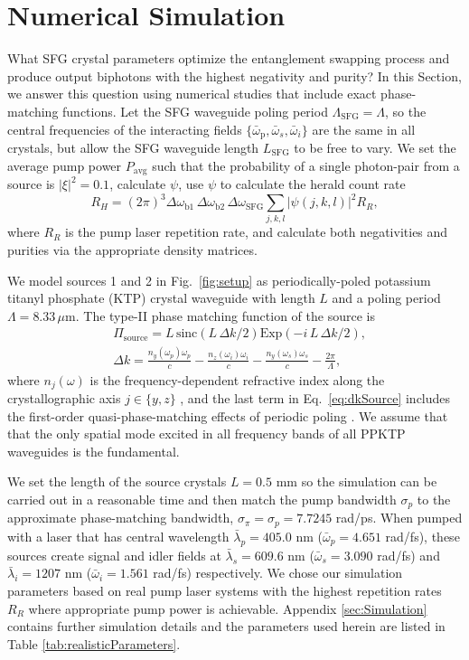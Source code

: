 \documentclass[twocolumn,amssymb, nobibnotes, showpacs, aps, pra,10pt]{revtex4-1}
\newcommand*{\ws}{\omega_{s}}
\newcommand*{\wpbar}{\bar{\omega}_{\text{p}}}
\newcommand*{\wbone}{\omega_{\textrm{b}1}}
\newcommand*{\wbtwo}{\omega_{\textrm{b}2}}
\newcommand*{\wsfg}{\omega_\textrm{SFG}}
\begin{document}
\section{Numerical Simulation} \label{sec:simulation}
What SFG crystal parameters optimize the entanglement swapping process and produce output biphotons with the highest negativity and purity? In this Section, we answer this question using numerical studies that include exact phase-matching functions. Let the SFG waveguide poling period $\Lambda_{\text{SFG}} = \Lambda$, so the central frequencies of the interacting fields $\{\wpbar, \bar{\omega}_s, \bar{\omega}_i \}$ are the same in all crystals, but allow the SFG waveguide length $L_{\text{SFG}}$ to be free to vary. We set the average pump power $P_{\text{avg}}$ such that the probability of a single photon-pair from a source is $|\xi|^2 = 0.1$, calculate $\psi$, use $\psi$ to calculate the herald count rate
\begin{equation}
R_H  = (2 \pi)^3 \Delta \wbone \, \Delta \wbtwo \, \Delta \wsfg   \sum_{j,k,l} |\psi(j,k,l)|^2 R_R,
\end{equation}
where $R_R$ is the pump laser repetition rate, and calculate both negativities and purities via the appropriate density matrices.

We model sources 1 and 2 in Fig.\ \ref{fig:setup} as periodically-poled potassium titanyl phosphate (KTP) crystal waveguide with length $L$ and a poling period $\Lambda=8.33\, \mu$m. The type-II phase matching function of the source is
\begin{align}
&\Pi_{\text{source}} =  L\, \text{sinc} \left(L \,\Delta k/2 \right) \text{Exp}\left( - i \, L \,\Delta k/2 \right), \label{eq:PMexact} \\
&\Delta k =   \frac{n_y (\omega_p) \omega_p}{c} - \frac{n_z (\omega_i) \omega_i}{c} - \frac{n_y (\ws) \ws}{c} - \frac{2 \pi}{\Lambda}, \label{eq:dkSource}
\end{align}
where $n_j (\omega)$ is the frequency-dependent refractive index along the crystallographic axis $j \in \{y, z\}$ \cite{Kato2002}, and the last term in Eq.\ \eqref{eq:dkSource} includes the first-order quasi-phase-matching effects of periodic poling \cite{Fejer1992}. We assume that that the only spatial mode excited in all frequency bands of all PPKTP waveguides is the fundamental. 

We set the length of the source crystals $L=0.5$ mm so the simulation can be carried out in a reasonable time and then match the pump bandwidth $\sigma_p$ to the approximate phase-matching bandwidth, $\sigma_\pi = \sigma_p =7.7245$ rad/ps. When pumped with a laser that has central wavelength $\bar{\lambda}_p=405.0$ nm ($\bar{\omega}_p = 4.651$ rad/fs), these sources create signal and idler fields at $\bar{\lambda}_s = 609.6$ nm ($\bar{\omega}_s = 3.090$ rad/fs) and $\bar{\lambda}_i = 1207$ nm ($\bar{\omega}_i = 1.561$ rad/fs) respectively. We chose our simulation parameters based on real pump laser systems \cite{Taccor} with the highest repetition rates $R_R$ where appropriate pump power is achievable. Appendix \ref{sec:Simulation} contains further simulation details and the parameters used herein are listed in Table \ref{tab:realisticParameters}.
\end{document}
